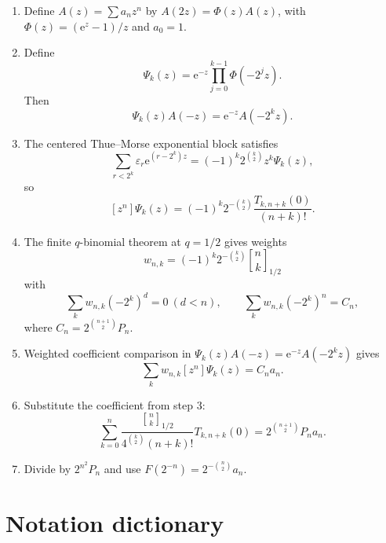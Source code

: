 \documentclass[11pt]{article}
\theoremstyle{definition}
\newcommand{\Fabius}{F}
\newcommand{\eps}{\varepsilon}
\newcommand{\Qbin}[3]{\genfrac{[}{]}{0pt}{}{#1}{#2}_{#3}}
\newcommand{\coeff}[2]{\left[#1\right]#2}
\newcommand{\e}{\mathrm{e}}
\begin{document}
\begin{enumerate}[leftmargin=2.4em]
  \item Define $A(z)=\sum a_nz^n$ by $A(2z)=\Phi(z)A(z)$, with $\Phi(z)=(\e^z-1)/z$ and $a_0=1$.

  \item Define
  \[
    \Psi_k(z)=\e^{-z}\prod_{j=0}^{k-1}\Phi(-2^jz).
  \]
  Then
  \[
    \Psi_k(z)A(-z)=\e^{-z}A(-2^kz).
  \]

  \item The centered Thue--Morse exponential block satisfies
  \[
    \sum_{r<2^k}\eps_r\e^{(r-2^k)z}
    =(-1)^k2^{\binom{k}{2}}z^k\Psi_k(z),
  \]
  so
  \[
    \coeff{z^n}{\Psi_k(z)}
    =(-1)^k2^{-\binom{k}{2}}
      \frac{T_{k,n+k}(0)}{(n+k)!}.
  \]

  \item The finite $q$-binomial theorem at $q=1/2$ gives weights
  \[
    w_{n,k}=(-1)^k2^{-\binom{k}{2}}\Qbin{n}{k}{1/2}
  \]
  with
  \[
    \sum_kw_{n,k}(-2^k)^d=0\ (d<n),
    \qquad
    \sum_kw_{n,k}(-2^k)^n=C_n,
  \]
  where $C_n=2^{\binom{n+1}{2}}P_n$.

  \item Weighted coefficient comparison in
  $\Psi_k(z)A(-z)=\e^{-z}A(-2^kz)$ gives
  \[
    \sum_kw_{n,k}\coeff{z^n}{\Psi_k(z)}=C_na_n.
  \]

  \item Substitute the coefficient from step 3:
  \[
    \sum_{k=0}^{n}
      \frac{\Qbin{n}{k}{1/2}}
           {4^{\binom{k}{2}}(n+k)!}
      T_{k,n+k}(0)
    =2^{\binom{n+1}{2}}P_na_n.
  \]

  \item Divide by $2^{n^2}P_n$ and use
  $\Fabius(2^{-n})=2^{-\binom n2}a_n$.
\end{enumerate}

\section{Notation dictionary}
\label{app:notation-dictionary}
\end{document}
